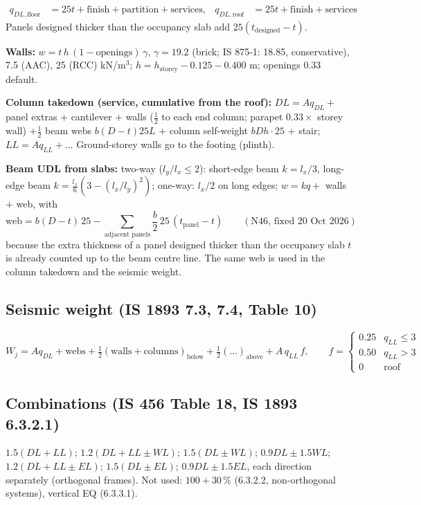 \documentclass[10pt,a4paper]{article}
\begin{document}
\begin{align*}
q_{DL,\text{floor}} &= 25t + \text{finish} + \text{partition} + \text{services}, &
q_{DL,\text{roof}} &= 25t + \text{finish} + \text{services}
\end{align*}
Panels designed thicker than the occupancy slab add $25(t_\text{designed}-t)$.

\textbf{Walls:} $w = t\,h\,(1-\text{openings})\,\gamma$, $\gamma = 19.2$ (brick; IS 875-1: 18.85, conservative),
7.5 (AAC), 25 (RCC) kN/m$^3$; $h = h_\text{storey} - 0.125 - 0.400$ m; openings 0.33 default.

\textbf{Column takedown (service, cumulative from the roof):} $DL = A q_{DL} + $ panel extras $+$ cantilever $+$
walls ($\tfrac12$ to each end column; parapet $0.33\times$ storey wall) $+ \tfrac12$ beam webs $b(D-t)25L$ $+$ column
self-weight $bDh\cdot25$ $+$ stair; $LL = A q_{LL}+\dots$ Ground-storey walls go to the footing (plinth).

\textbf{Beam UDL from slabs:} two-way ($l_y/l_x\le2$): short-edge beam $k=l_x/3$, long-edge beam
$k=\frac{l_x}{6}\left(3-(l_x/l_y)^2\right)$; one-way: $l_x/2$ on long edges; $w = kq + $ walls $+$ web, with
\[
\text{web}=b(D-t)\,25-\sum_{\text{adjacent panels}}\frac b2\,25\,(t_\text{panel}-t)\qquad(\text{N46, fixed 20 Oct 2026})
\]
because the extra thickness of a panel designed thicker than the occupancy slab $t$ is already counted up to the beam
centre line. The same web is used in the column takedown and the seismic weight.

\subsection{Seismic weight (IS 1893 7.3, 7.4, Table 10)}
\[
W_j = A q_{DL} + \text{webs} + \tfrac12(\text{walls}+\text{columns})_\text{below}+\tfrac12(\dots)_\text{above}
+ A\,q_{LL}\,f,\qquad f=\begin{cases}0.25 & q_{LL}\le3\\0.50 & q_{LL}>3\\0 & \text{roof}\end{cases}
\]

\subsection{Combinations (IS 456 Table 18, IS 1893 6.3.2.1)}
$1.5(DL+LL)$; $1.2(DL+LL\pm WL)$; $1.5(DL\pm WL)$; $0.9DL\pm1.5WL$; $1.2(DL+LL\pm EL)$; $1.5(DL\pm EL)$;
$0.9DL\pm1.5EL$, each direction separately (orthogonal frames). Not used: $100+30\,\%$ (6.3.2.2, non-orthogonal
systems), vertical EQ (6.3.3.1).
\end{document}
